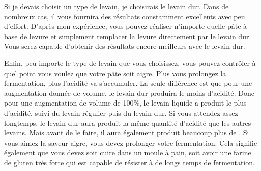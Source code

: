 Si je devais choisir un type de levain, je choisirais le levain dur. Dans de nombreux cas,
il vous fournira des résultats constamment excellents avec peu d'effort.
D'après mon expérience, vous pouvez réaliser n'importe quelle pâte à base de levure et simplement remplacer
la levure directement par le levain dur. Vous serez capable
d'obtenir des résultats encore meilleurs avec le levain dur.

Enfin, peu importe le type de levain que vous choisissez, vous pouvez contrôler à quel point
vous voulez que votre pâte soit aigre. Plus vous prolongez la fermentation, plus
l'acidité va s'accumuler. La seule différence est que pour une augmentation donnée
de volume, le levain dur produira le moins d'acidité. Donc pour une
augmentation de volume de 100\%, le levain liquide a produit le plus d'acidité,
suivi du levain régulier puis du levain dur. Si vous attendez assez
longtemps, le levain dur aura produit la même quantité d'acidité que les
autres levains. Mais avant de le faire, il aura également produit beaucoup plus de . Si
vous aimez la saveur aigre, vous devez prolonger votre fermentation. Cela signifie également
que vous devez soit cuire dans un moule à pain, soit avoir une farine de gluten très forte
qui est capable de résister à de longs temps de fermentation.